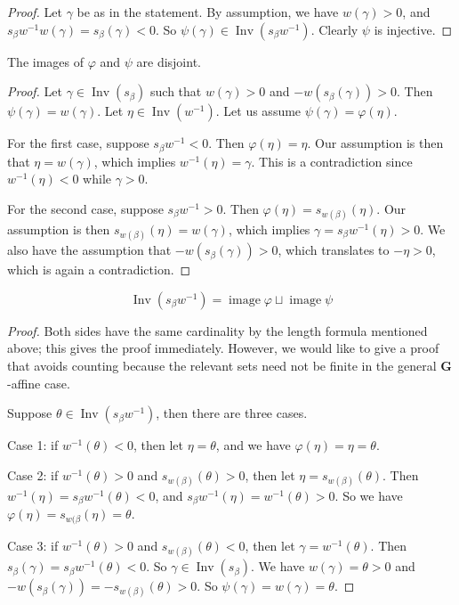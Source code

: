 \documentclass[ALCO,ThmDefs,Unicode]{cedram}
\DeclareMathOperator{\im}{image}
\DeclareMathOperator{\Inv}{Inv}
\newcommand{\bG}{\mathbf{G}}
\begin{document}
\begin{proof}
Let $\gamma$ be as in the statement. By assumption, we have $w(\gamma) > 0$, and $s_\beta w^{-1} w (\gamma) = s_\beta(\gamma) < 0$. So $\psi(\gamma) \in \Inv(s_\beta w^{-1})$. Clearly $\psi$ is injective.
\end{proof}

\begin{prop}\label{prop-phi-psi-disjoint}
The images of $\varphi$ and $\psi$ are disjoint.
\end{prop}

\begin{proof}
Let $\gamma \in \Inv(s_\beta)$ such that $w(\gamma) > 0$ and $- w(s_\beta(\gamma)) >0 $. Then $\psi(\gamma) = w(\gamma)$. Let $\eta \in \Inv(w^{-1})$. Let us assume $\psi(\gamma) = \varphi(\eta)$.

For the first case, suppose $s_\beta w^{-1} < 0 $. Then $\varphi(\eta) = \eta$. Our assumption is then that $\eta = w(\gamma)$, which implies $w^{-1}(\eta) = \gamma$. This is a contradiction since $w^{-1}(\eta) < 0$ while $\gamma > 0$.

For the second case, suppose $s_\beta w^{-1} > 0$. Then $\varphi(\eta) = s_{w(\beta)}(\eta)$. Our assumption is then $s_{w(\beta)}(\eta) = w(\gamma)$, which implies $\gamma = s_{\beta} w^{-1} (\eta) > 0$. We also have the assumption that $- w (s_{\beta}(\gamma)) > 0$, which translates to $-\eta > 0$, which is again a contradiction.
\end{proof}

\begin{coro}\label{cor-phi-psi-cover-everything}
\begin{equation}\label{eq:17}
\Inv(s_\beta w^{-1}) = \im \varphi \sqcup \im \psi
\end{equation}
\end{coro}

\begin{proof}
Both sides have the same cardinality by the length formula mentioned above; this gives the proof immediately. However, we would like to give a proof that avoids counting because the relevant sets need not be finite in the general $\bG$-affine case.

Suppose $\theta \in \Inv(s_\beta w^{-1})$, then there are three cases.

\noindent Case 1: if $w^{-1}(\theta) < 0$, then let $\eta = \theta$, and we have $\varphi(\eta) = \eta = \theta$.

\noindent Case 2: if $w^{-1}(\theta) > 0$ and $ s_{w(\beta)}(\theta) > 0$, then let $\eta = s_{w(\beta)}(\theta)$. Then $w^{-1}(\eta) = s_\beta w^{-1}(\theta) < 0$, and $s_\beta w^{-1} (\eta) = w^{-1}(\theta) > 0$. So we have $\varphi(\eta) = s_{w(\beta} (\eta) = \theta$.

\noindent Case 3: if $w^{-1}(\theta) > 0$ and $ s_{w(\beta)}(\theta) < 0$, then let $\gamma = w^{-1}(\theta)$. Then $s_\beta (\gamma) = s_\beta w^{-1}(\theta) < 0$. So $\gamma \in \Inv(s_\beta)$. We have $w(\gamma) = \theta > 0$ and $- w(s_\beta(\gamma)) = - s_{w(\beta)}(\theta) > 0$. So $\psi(\gamma) = w(\gamma) = \theta$.
\end{proof}
\end{document}
